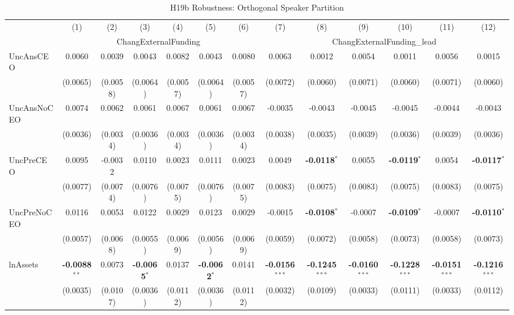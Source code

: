 \begin{landscape}
\begin{table}[H]
\setlength{\tabcolsep}{3pt}
\renewcommand{\arraystretch}{0.85}
\centering
\caption{H19b Robustness: Orthogonal Speaker Partition}
\label{tab:h19b_robust}
\scriptsize
\begin{tabular}{lcccccccccccc}
\toprule
 & (1) & (2) & (3) & (4) & (5) & (6) & (7) & (8) & (9) & (10) & (11) & (12) \\
 & \multicolumn{6}{c}{ChangExternalFunding} & \multicolumn{6}{c}{ChangExternalFunding\_lead} \\
\cmidrule(lr){2-7} \cmidrule(lr){8-13}
\midrule
UncAnsCEO & 0.0060 & 0.0039 & 0.0043 & 0.0082 & 0.0043 & 0.0080 & 0.0063 & 0.0012 & 0.0054 & 0.0011 & 0.0056 & 0.0015 \\
 & (0.0065) & (0.0058) & (0.0064) & (0.0057) & (0.0064) & (0.0057) & (0.0072) & (0.0060) & (0.0071) & (0.0060) & (0.0071) & (0.0060) \\
UncAnsNoCEO & 0.0074 & 0.0062 & 0.0061 & 0.0067 & 0.0061 & 0.0067 & -0.0035 & -0.0043 & -0.0045 & -0.0045 & -0.0044 & -0.0043 \\
 & (0.0036) & (0.0034) & (0.0036) & (0.0034) & (0.0036) & (0.0034) & (0.0038) & (0.0035) & (0.0039) & (0.0036) & (0.0039) & (0.0036) \\
UncPreCEO & 0.0095 & -0.0032 & 0.0110 & 0.0023 & 0.0111 & 0.0023 & 0.0049 & \textbf{-0.0118}$^{*}$ & 0.0055 & \textbf{-0.0119}$^{*}$ & 0.0054 & \textbf{-0.0117}$^{*}$ \\
 & (0.0077) & (0.0074) & (0.0076) & (0.0075) & (0.0076) & (0.0075) & (0.0083) & (0.0075) & (0.0083) & (0.0075) & (0.0083) & (0.0075) \\
UncPreNoCEO & 0.0116 & 0.0053 & 0.0122 & 0.0029 & 0.0123 & 0.0029 & -0.0015 & \textbf{-0.0108}$^{*}$ & -0.0007 & \textbf{-0.0109}$^{*}$ & -0.0007 & \textbf{-0.0110}$^{*}$ \\
 & (0.0057) & (0.0068) & (0.0055) & (0.0069) & (0.0056) & (0.0069) & (0.0059) & (0.0072) & (0.0058) & (0.0073) & (0.0058) & (0.0073) \\
\midrule
lnAssets & \textbf{-0.0088}$^{**}$ & 0.0073 & \textbf{-0.0065}$^{*}$ & 0.0137 & \textbf{-0.0062}$^{*}$ & 0.0141 & \textbf{-0.0156}$^{***}$ & \textbf{-0.1245}$^{***}$ & \textbf{-0.0160}$^{***}$ & \textbf{-0.1228}$^{***}$ & \textbf{-0.0151}$^{***}$ & \textbf{-0.1216}$^{***}$ \\
 & (0.0035) & (0.0107) & (0.0036) & (0.0112) & (0.0036) & (0.0112) & (0.0032) & (0.0109) & (0.0033) & (0.0111) & (0.0033) & (0.0112) \\

\end{tabular}
\end{table}
\end{landscape}
